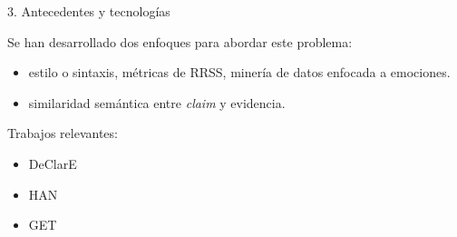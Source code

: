 \begin{frame}{3. Antecedentes y tecnologías}


Se han desarrollado dos enfoques para abordar este problema:
\begin{itemize}
    \item \underline{}  estilo o sintaxis, métricas de RRSS, minería de datos enfocada a emociones.
    \item \underline{} similaridad semántica entre \textit{claim} y evidencia.
\end{itemize} 

\vspace{2ex}

Trabajos relevantes: 
\begin{itemize}
    \item DeClarE \citep{Popat2018}
    \item HAN \citep{Ma2019}
    \item GET \citep{Xu2022}
\end{itemize}

\end{frame}







